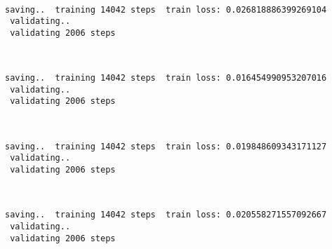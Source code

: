 \documentclass[11pt]{article}
\begin{document}
    \begin{center}
    \end{center}
    { \hspace*{\fill} \\}
    
    \begin{Verbatim}[commandchars=\\\{\}]
 saving..  training 14042 steps  train loss: 0.026818886399269104
 validating..
 validating 2006 steps
    \end{Verbatim}

    \begin{center}
    \end{center}
    { \hspace*{\fill} \\}
    
    \begin{Verbatim}[commandchars=\\\{\}]
 saving..  training 14042 steps  train loss: 0.016454990953207016
 validating..
 validating 2006 steps
    \end{Verbatim}

    \begin{center}
    \end{center}
    { \hspace*{\fill} \\}
    
    \begin{Verbatim}[commandchars=\\\{\}]
 saving..  training 14042 steps  train loss: 0.019848609343171127
 validating..
 validating 2006 steps
    \end{Verbatim}

    \begin{center}
    \end{center}
    { \hspace*{\fill} \\}
    
    \begin{Verbatim}[commandchars=\\\{\}]
 saving..  training 14042 steps  train loss: 0.020558271557092667
 validating..
 validating 2006 steps
    \end{Verbatim}
\end{document}
